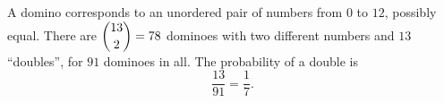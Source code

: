 A domino corresponds to an unordered pair of numbers from $0$ to $12$, possibly equal. There are $\dbinom{13}{2}=78$ dominoes with two different numbers and $13$ ``doubles'', for $91$ dominoes in all. The probability of a double is
\[\dfrac{13}{91}=\boxed{\dfrac{1}{7}}.\]
